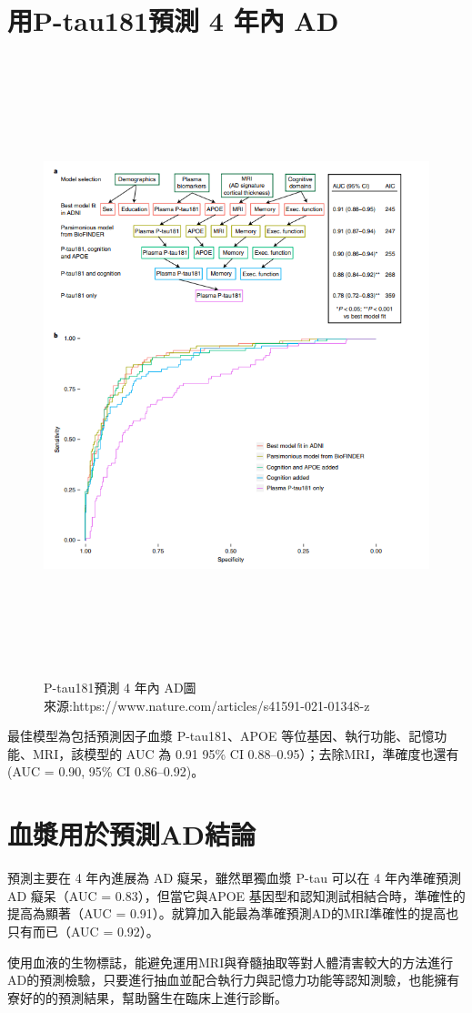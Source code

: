 \section{用P-tau181預測 4 年內 AD }
\begin{figure}[H]
	\centerline{\includegraphics[height=18cm]{pic/AD181.PNG}}
	\caption{P-tau181預測 4 年內 AD圖\\來源:https://www.nature.com/articles/s41591-021-01348-z}
	\label{fig:AD181}
\end{figure}
最佳模型為包括預測因子血漿 P-tau181、APOE 等位基因、執行功能、記憶功能、MRI，該模型的 AUC 為 0.91 95\% CI 0.88–0.95）；去除MRI，準確度也還有 (AUC = 0.90, 95\% CI 0.86–0.92)。


\section{血漿用於預測AD結論}
預測主要在 4 年內進展為 AD 癡呆，雖然單獨血漿 P-tau 可以在 4 年內準確預測 AD 癡呆（AUC = 0.83），但當它與APOE 基因型和認知測試相結合時，準確性的提高為顯著（AUC = 0.91）。就算加入能最為準確預測AD的MRI準確性的提高也只有而已（AUC = 0.92）。

使用血液的生物標誌，能避免運用MRI與脊髓抽取等對人體清害較大的方法進行AD的預測檢驗，只要進行抽血並配合執行力與記憶力功能等認知測驗，也能擁有寮好的的預測結果，幫助醫生在臨床上進行診斷。

